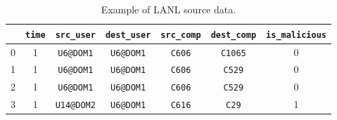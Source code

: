 \documentclass[sigconf]{acmart}
\begin{document}
\begin{table}[t]
  \centering
  \begin{tabular}{|c|c|c|c|c|c|c|}
  \hline
    & \texttt{time} & \texttt{src\_user} & \texttt{dest\_user} & \texttt{src\_comp} & \texttt{dest\_comp} & \texttt{is\_malicious} \\
  \hline
  0 & 1             & \texttt{U6@DOM1}   & \texttt{U6@DOM1}    & \texttt{C606}      & \texttt{C1065}      & 0                      \\
  \hline
  1 & 1             & \texttt{U6@DOM1}   & \texttt{U6@DOM1}    & \texttt{C606}      & \texttt{C529}       & 0                      \\
  \hline
  2 & 1             & \texttt{U6@DOM1}   & \texttt{U6@DOM1}    & \texttt{C606}      & \texttt{C529}       & 0                      \\
  \hline
  3 & 1             & \texttt{U14@DOM2}   & \texttt{U6@DOM1}    & \texttt{C616}      & \texttt{C29}       & 1                      \\
  \hline
  \end{tabular}
  \caption{Example of LANL source data.}
  \label{tab:1}
\end{table}
\end{document}
